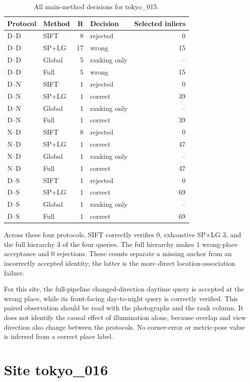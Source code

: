 \begin{table}[H]\centering\small
\caption{All main-method decisions for tokyo\_015.}\label{tab:tokyo-site-15}
\begin{tabular}{llrlr}\toprule
Protocol & Method & R & Decision & Selected inliers \\
\midrule
D--D & SIFT & 8 & rejected & 0 \\
D--D & SP+LG & 17 & wrong & 15 \\
D--D & Global & 5 & ranking only & -- \\
D--D & Full & 5 & wrong & 15 \\
D--N & SIFT & 1 & rejected & 0 \\
D--N & SP+LG & 1 & correct & 39 \\
D--N & Global & 1 & ranking only & -- \\
D--N & Full & 1 & correct & 39 \\
N--D & SIFT & 8 & rejected & 0 \\
N--D & SP+LG & 1 & correct & 47 \\
N--D & Global & 1 & ranking only & -- \\
N--D & Full & 1 & correct & 47 \\
D--S & SIFT & 1 & rejected & 0 \\
D--S & SP+LG & 1 & correct & 69 \\
D--S & Global & 1 & ranking only & -- \\
D--S & Full & 1 & correct & 69 \\
\bottomrule\end{tabular}\end{table}


Across these four protocols, SIFT correctly verifies 0, exhaustive SP+LG 3, and the full hierarchy 3 of the four queries. The full hierarchy makes 1 wrong-place acceptance and 0 rejections. These counts separate a missing anchor from an incorrectly accepted identity; the latter is the more direct location-association failure.

For this site, the full-pipeline changed-direction daytime query is accepted at the wrong place, while its front-facing day-to-night query is correctly verified. This paired observation should be read with the photographs and the rank column. It does not identify the causal effect of illumination alone, because overlap and view direction also change between the protocols. No corner-error or metric-pose value is inferred from a correct place label.

\section{Site tokyo\_016}

